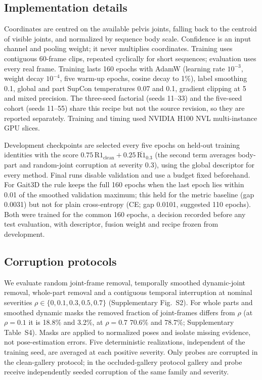 \documentclass[journal]{IEEEtran}
\begin{document}
\subsection{Implementation details}

Coordinates are centred on the available pelvis joints, falling back to the
centroid of visible joints, and normalized by sequence body scale. Confidence is
an input channel and pooling weight; it never multiplies coordinates. Training
uses contiguous 60-frame clips, repeated cyclically for short sequences;
evaluation uses every real frame. Training lasts 160 epochs with AdamW (learning rate $10^{-3}$,
weight decay $10^{-4}$, five warm-up epochs, cosine decay to 1\%), label
smoothing 0.1, global and part SupCon temperatures 0.07 and 0.1, gradient
clipping at 5 and mixed precision. The three-seed
factorial (seeds 11--33) and the five-seed cohort (seeds 11--55) share this
recipe but not the source revision, so they are reported separately. Training
and timing used NVIDIA H100 NVL multi-instance GPU slices.

Development checkpoints are selected every five epochs on held-out training
identities with the score $0.75\,\mathrm{R1}_{\mathrm{clean}} +
0.25\,\overline{\mathrm{R1}}_{0.3}$ (the second term averages body-part and
random-joint corruption at severity 0.3), using the global descriptor for every
method. Final runs disable validation and use a budget fixed beforehand. For
Gait3D the rule keeps the full 160 epochs when the last epoch lies within 0.01
of the smoothed validation maximum; this held for the metric baseline (gap
0.0031) but not for plain cross-entropy (CE; gap 0.0101, suggested 110 epochs).
Both were trained for the common 160 epochs, a decision recorded before any test
evaluation, with descriptor, fusion weight and recipe frozen from development.

\subsection{Corruption protocols}

We evaluate random joint-frame removal, temporally smoothed dynamic-joint
removal, whole-part removal and a contiguous temporal interruption at nominal
severities $\rho\in\{0,0.1,0.3,0.5,0.7\}$ (Supplementary Fig.~S2). For whole parts
and smoothed dynamic masks the removed fraction of joint-frames differs from
$\rho$ (at $\rho=0.1$ it is 18.8\% and 3.2\%, at $\rho=0.7$ 70.6\% and 78.7\%;
Supplementary Table~S4). Masks are applied to normalized poses and isolate
missing evidence, not pose-estimation errors. Five deterministic realizations,
independent of the training seed, are averaged at each positive severity. Only
probes are corrupted in the clean-gallery protocol; in the occluded-gallery
protocol gallery and probe receive independently seeded corruption of the same
family and severity.
\end{document}
